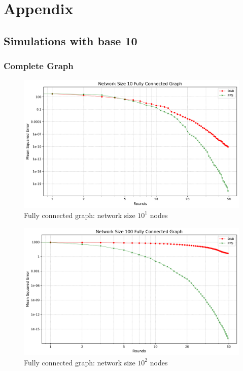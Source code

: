 \chapter{Appendix}\label{chap:appendix}
\section{Simulations with base 10}
\subsection{Complete Graph}
\begin{figure}[H]
    \centering
    \includegraphics[scale=0.5]{figures/completeGraphSimulations/DAB_vs_PPS_FCG_r50_n10.png}
    \caption{Fully connected graph: network size $10^{1}$ nodes}
    \label{fig:10CompleteGraph}
\end{figure}
\begin{figure}[H]
    \centering
    \includegraphics[scale=0.5]{figures/completeGraphSimulations/DAB_vs_PPS_FCG_r50_n100.png}
    \caption{Fully connected graph: network size $10^{2}$ nodes}
    \label{fig:100CompleteGraph}
\end{figure}

